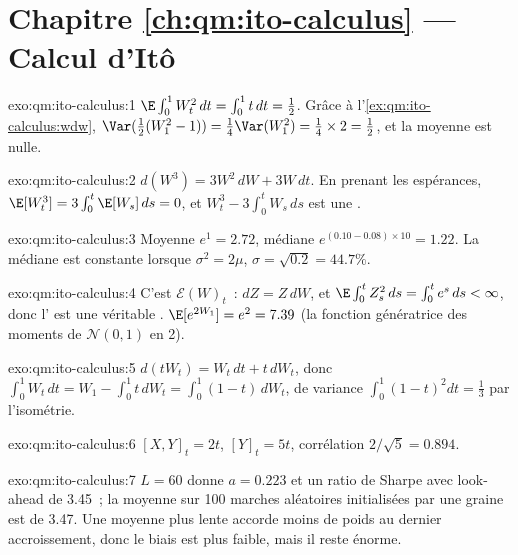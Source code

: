 \section*{Chapitre \ref{ch:qm:ito-calculus} --- Calcul d'Itô}

\begin{solution}{exo:qm:ito-calculus:1}
$\E\int_0^1W_t^2\,dt = \int_0^1t\,dt = \tfrac12$. Grâce à l'\cref{ex:qm:ito-calculus:wdw},
$\Var(\tfrac12(W_1^2 - 1)) = \tfrac14\Var(W_1^2) = \tfrac14 \times 2 = \tfrac12$, et la moyenne est nulle.
\end{solution}

\begin{solution}{exo:qm:ito-calculus:2}
$d(W^3) = 3W^2\,dW + 3W\,dt$. En prenant les espérances, $\E[W_t^3] = 3\int_0^t\E[W_s]\,ds = 0$, et
$W_t^3 - 3\int_0^tW_s\,ds$ est une .
\end{solution}

\begin{solution}{exo:qm:ito-calculus:3}
Moyenne $e^{1} = 2.72$, médiane $e^{(0.10 - 0.08) \times 10} = 1.22$. La médiane est constante lorsque $\sigma^2 = 2\mu$,
$\sigma = \sqrt{0.2} = 44.7\%$.
\end{solution}

\begin{solution}{exo:qm:ito-calculus:4}
C'est $\mathcal E(W)_t$~: $dZ = Z\,dW$, et $\E\int_0^tZ_s^2\,ds = \int_0^te^s\,ds < \infty$, donc l'
est une véritable . $\E[e^{2W_1}] = e^{2}= 7.39$ (la fonction génératrice des moments de $\mathcal
N(0,1)$ en 2).
\end{solution}

\begin{solution}{exo:qm:ito-calculus:5}
$d(tW_t) = W_t\,dt + t\,dW_t$, donc $\int_0^1W_t\,dt = W_1 - \int_0^1t\,dW_t = \int_0^1(1 - t)\,dW_t$, de variance
$\int_0^1(1 - t)^2dt = \tfrac13$ par l'isométrie.
\end{solution}

\begin{solution}{exo:qm:ito-calculus:6}
$[X, Y]_t = 2t$, $[Y]_t = 5t$, corrélation $2/\sqrt5 = 0.894$.
\end{solution}

\begin{solution}{exo:qm:ito-calculus:7}
$L = 60$ donne $a = 0.223$ et un ratio de Sharpe avec look-ahead de 3.45~; la moyenne sur 100
marches aléatoires initialisées par une graine est de 3.47. Une moyenne plus lente accorde moins de poids au dernier accroissement, donc le biais est plus faible,
mais il reste énorme.
\end{solution}

